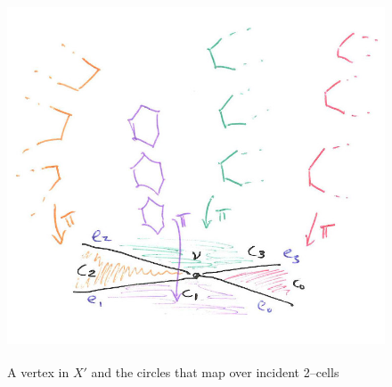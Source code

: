 \begin{figure}
	\centering
	\captionsetup{justification=centering}
	\caption{A vertex in $X'$ and the circles that map over incident 2--cells}
	\includegraphics[height=4in]{figures/vertexprime.jpg}
	\label{fig:vertexprime}
\end{figure}